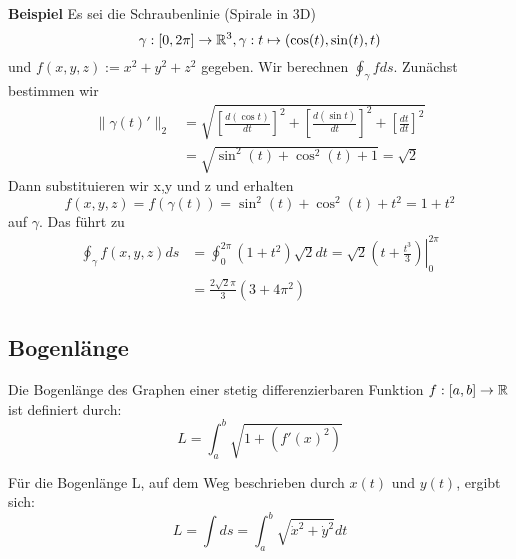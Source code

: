 \textbf{Beispiel}
Es sei die Schraubenlinie (Spirale in 3D)
\[
\gamma : [0,2\pi]  \to \mathbb{R}^3, \gamma : t \mapsto  (\cos(t), \sin(t), t) 
\]
und $f(x,y,z) := x^2 + y^2 + z^2$ gegeben. Wir berechnen $\oint_\gamma f ds$. Zunächst bestimmen wir
\begin{align*}
\|\gamma(t)'\|_2 &= \sqrt{\left[\frac{d(\cos t)}{dt}\right]^2 +
\left[\frac{d(\sin t)}{dt}\right]^2 + \left[\frac{dt}{dt}\right]^2} \\
&= \sqrt{\sin^2(t)+\cos^2(t)+1}=\sqrt{2}
\end{align*}
Dann substituieren wir x,y und z und erhalten
\[
f(x,y,z) = f(\gamma(t)) = \sin^2(t)+\cos^2(t)+t^2 = 1 +t^2
\]
auf $\gamma$. Das führt zu
\begin{align*}
\oint_\gamma f(x,y,z) ds &= \oint_0^{2\pi} (1 +t^2)\sqrt{2} dt = \left. \sqrt{2}(t+\frac{t^3}{3}) \right|_0^{2\pi} \\
&= \frac{2\sqrt{2}\pi}{3}(3+4\pi^2)
\end{align*}

\subsection{Bogenlänge}
\begin{definition} Die Bogenlänge des Graphen einer stetig differenzierbaren Funktion $f: [a, b] \to \mathbb{R}$ ist definiert durch:
\[
	L = \int_a^b \sqrt{1 + (f'(x)^2)}
\]
\end{definition}

\begin{definition} Für die Bogenlänge L, auf dem Weg beschrieben durch $x(t)$ und $y(t)$, ergibt sich: 
\[
	L = \int ds = \int_a^b \sqrt{\dot{x}^2 + \dot{y}^2} dt
\]
\end{definition}
\pagebreak